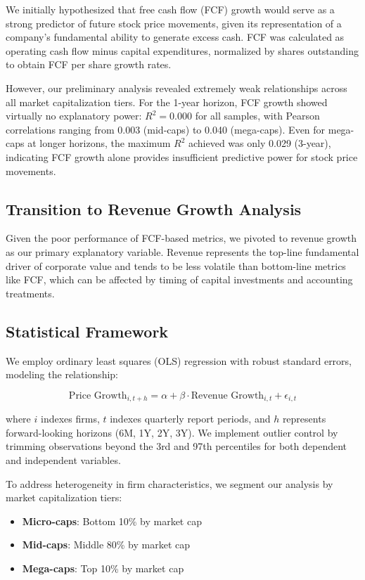 \documentclass[11pt]{article}
\begin{document}
We initially hypothesized that free cash flow (FCF) growth would serve as a strong predictor of future stock price movements, given its representation of a company's fundamental ability to generate excess cash. FCF was calculated as operating cash flow minus capital expenditures, normalized by shares outstanding to obtain FCF per share growth rates.

However, our preliminary analysis revealed extremely weak relationships across all market capitalization tiers. For the 1-year horizon, FCF growth showed virtually no explanatory power: $R^2 = 0.000$ for all samples, with Pearson correlations ranging from 0.003 (mid-caps) to 0.040 (mega-caps). Even for mega-caps at longer horizons, the maximum $R^2$ achieved was only 0.029 (3-year), indicating FCF growth alone provides insufficient predictive power for stock price movements.

\subsection{Transition to Revenue Growth Analysis}

Given the poor performance of FCF-based metrics, we pivoted to revenue growth as our primary explanatory variable. Revenue represents the top-line fundamental driver of corporate value and tends to be less volatile than bottom-line metrics like FCF, which can be affected by timing of capital investments and accounting treatments.

\subsection{Statistical Framework}

We employ ordinary least squares (OLS) regression with robust standard errors, modeling the relationship:

\begin{equation}
\text{Price Growth}_{i,t+h} = \alpha + \beta \cdot \text{Revenue Growth}_{i,t} + \epsilon_{i,t}
\end{equation}

where $i$ indexes firms, $t$ indexes quarterly report periods, and $h$ represents forward-looking horizons (6M, 1Y, 2Y, 3Y). We implement outlier control by trimming observations beyond the 3rd and 97th percentiles for both dependent and independent variables.

To address heterogeneity in firm characteristics, we segment our analysis by market capitalization tiers:
\begin{itemize}
\item \textbf{Micro-caps}: Bottom 10\% by market cap
\item \textbf{Mid-caps}: Middle 80\% by market cap  
\item \textbf{Mega-caps}: Top 10\% by market cap
\end{itemize}
\end{document}

